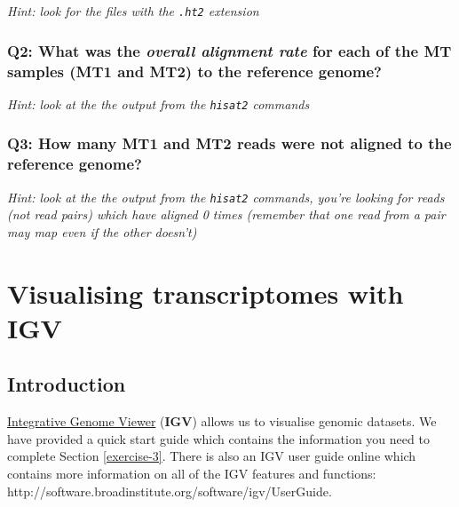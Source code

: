 \documentclass[11pt]{article}
\begin{document}
\textit{Hint: look for the files with the \texttt{.ht2} extension}

\hypertarget{q2-what-was-the-overall-alignment-rate-for-each-of-the-mt-samples-mt1-and-mt2-to-the-reference-genome}{%
\subsubsection{\texorpdfstring{Q2: What was the \textit{overall alignment
rate} for each of the MT samples (MT1 and MT2) to the reference
genome?}{Q2: What was the overall alignment rate for each of the MT samples (MT1 and MT2) to the reference genome?}}\label{q2-what-was-the-overall-alignment-rate-for-each-of-the-mt-samples-mt1-and-mt2-to-the-reference-genome}}

\textit{Hint: look at the the output from the \texttt{hisat2} commands}

\hypertarget{q3-how-many-mt1-and-mt2-reads-were-not-aligned-to-the-reference-genome}{%
\subsubsection{Q3: How many MT1 and MT2 reads were not aligned to the
reference
genome?}\label{q3-how-many-mt1-and-mt2-reads-were-not-aligned-to-the-reference-genome}}

\textit{Hint: look at the the output from the \texttt{hisat2} commands,
you're looking for reads (not read pairs) which have aligned 0 times
(remember that one read from a pair may map even if the other doesn't)}





\newpage





    \hypertarget{visualising-transcriptomes-with-igv}{%
\section{Visualising transcriptomes with
IGV}\label{visualising-transcriptomes-with-igv}}

    \hypertarget{introduction}{%
\subsection{Introduction}\label{introduction}}

\href{https://software.broadinstitute.org/software/igv/}{Integrative
Genome Viewer} (\textbf{IGV}) allows us to visualise genomic datasets.
We have provided a quick start guide which contains the information you
need to complete Section \ref{exercise-3}. There is also an IGV user
guide online which contains more information on all of the IGV features
and functions:
http://software.broadinstitute.org/software/igv/UserGuide.
\end{document}
